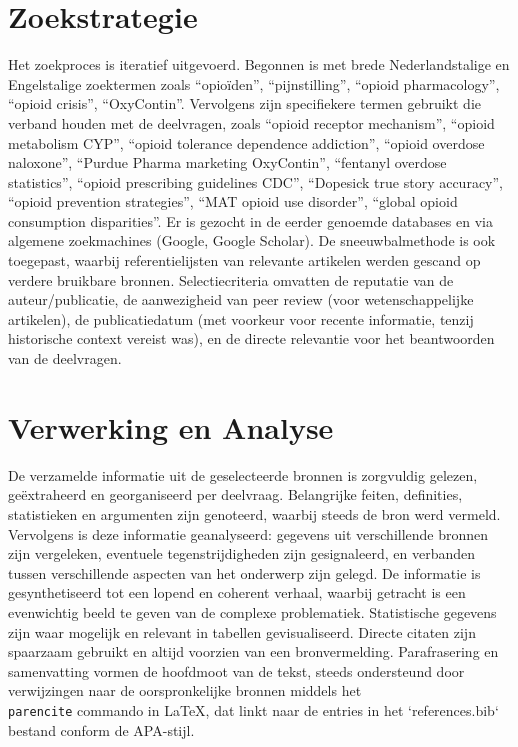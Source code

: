 \documentclass[11pt, a4paper]{report} %
\begin{document}
\section{Zoekstrategie}
Het zoekproces is iteratief uitgevoerd. Begonnen is met brede Nederlandstalige en Engelstalige zoektermen zoals \enquote{opioïden}, \enquote{pijnstilling}, \enquote{opioid pharmacology}, \enquote{opioid crisis}, \enquote{OxyContin}. Vervolgens zijn specifiekere termen gebruikt die verband houden met de deelvragen, zoals \enquote{opioid receptor mechanism}, \enquote{opioid metabolism CYP}, \enquote{opioid tolerance dependence addiction}, \enquote{opioid overdose naloxone}, \enquote{Purdue Pharma marketing OxyContin}, \enquote{fentanyl overdose statistics}, \enquote{opioid prescribing guidelines CDC}, \enquote{Dopesick true story accuracy}, \enquote{opioid prevention strategies}, \enquote{MAT opioid use disorder}, \enquote{global opioid consumption disparities}. Er is gezocht in de eerder genoemde databases en via algemene zoekmachines (Google, Google Scholar). De sneeuwbalmethode is ook toegepast, waarbij referentielijsten van relevante artikelen werden gescand op verdere bruikbare bronnen. Selectiecriteria omvatten de reputatie van de auteur/publicatie, de aanwezigheid van peer review (voor wetenschappelijke artikelen), de publicatiedatum (met voorkeur voor recente informatie, tenzij historische context vereist was), en de directe relevantie voor het beantwoorden van de deelvragen.

\section{Verwerking en Analyse}
De verzamelde informatie uit de geselecteerde bronnen is zorgvuldig gelezen, geëxtraheerd en georganiseerd per deelvraag. Belangrijke feiten, definities, statistieken en argumenten zijn genoteerd, waarbij steeds de bron werd vermeld. Vervolgens is deze informatie geanalyseerd: gegevens uit verschillende bronnen zijn vergeleken, eventuele tegenstrijdigheden zijn gesignaleerd, en verbanden tussen verschillende aspecten van het onderwerp zijn gelegd. De informatie is gesynthetiseerd tot een lopend en coherent verhaal, waarbij getracht is een evenwichtig beeld te geven van de complexe problematiek. Statistische gegevens zijn waar mogelijk en relevant in tabellen gevisualiseerd. Directe citaten zijn spaarzaam gebruikt en altijd voorzien van een bronvermelding. Parafrasering en samenvatting vormen de hoofdmoot van de tekst, steeds ondersteund door verwijzingen naar de oorspronkelijke bronnen middels het \texttt{\\parencite} commando in LaTeX, dat linkt naar de entries in het `references.bib` bestand conform de APA-stijl.
\end{document}
